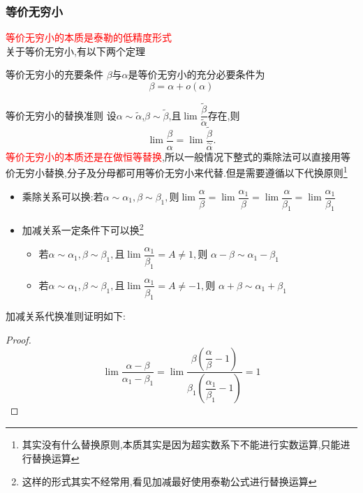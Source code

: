 \documentclass[8pt a4paper, oneside, UTF8]{ctexbook}
\begin{document}
\begin{sloppypar}
    \subsubsection{等价无穷小}
    \textcolor{red}{等价无穷小的本质是泰勒的低精度形式}\\
    关于等价无穷小,有以下两个定理
    \begin{defn}{等价无穷小的充要条件}{}
        $\beta$与$\alpha$是等价无穷小的充分必要条件为
        $$
            \beta=\alpha + o(\alpha)
        $$
    \end{defn}
    \begin{defn}{等价无穷小的替换准则}{}
        设$\alpha\sim\widetilde{\alpha}$,$\beta\sim\widetilde{\beta}$,且$\lim\dfrac{\widetilde{\beta}}{\widetilde{\alpha}}$存在,则
        $$
            \lim\dfrac{\beta}{\alpha}=\lim\dfrac{\widetilde{\beta}}{\overset{\sim}{\alpha}}.
        $$
        \textcolor{red}{等价无穷小的本质还是在做恒等替换},所以一般情况下整式的乘除法可以直接用等价无穷小替换,分子及分母都可用等价无穷小来代替.但是需要遵循以下代换原则\footnote{其实没有什么替换原则,本质其实是因为超实数系下不能进行实数运算,只能进行替换运算}
        \begin{itemize}
            \item 乘除关系可以换:若$\alpha\sim\alpha_1,\beta\sim\beta_1,\text{则}\lim\dfrac\alpha\beta=\lim\dfrac{\alpha_1}\beta=\lim\dfrac\alpha{\beta_1}=\lim\dfrac{\alpha_1}{\beta_1}$
            \item 加减关系一定条件下可以换\footnote{这样的形式其实不经常用,看见加减最好使用泰勒公式进行替换运算}
                  \begin{itemize}
                      \item 若$\alpha\sim\alpha_{1},\beta\sim\beta_{1},\text{且}\operatorname*{lim}\dfrac{\alpha_{1}}{\beta_{1}}=A\neq1,\text{则 }\alpha-\beta\sim\alpha_{1}-\beta_{1}$
                      \item 若$\alpha\sim\alpha_{1},\beta\sim\beta_{1},\text{且}\operatorname*{lim}\dfrac{\alpha_{1}}{\beta_{1}}=A\neq-1,\text{则 }\alpha+\beta\sim\alpha_{1}+\beta_{1}$
                  \end{itemize}
        \end{itemize}
        加减关系代换准则证明如下:
        \begin{proof}
            $$\lim \dfrac{\alpha-\beta}{\alpha_1 -\beta_1}=\lim \dfrac{\beta (\dfrac{\alpha}{\beta}-1)}{\beta_1(\dfrac{\alpha_1}{\beta_1}-1)}=1$$
        \end{proof}
    \end{defn}

\end{sloppypar}
\end{document}
